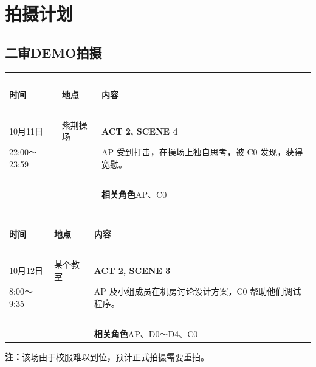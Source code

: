 \documentclass[10pt, a5paper, oneside]{memoir}
\begin{document}

\chapter*{拍摄计划}

\section*{二审DEMO拍摄}

\begin{table}[!ht]
	\raggedright
	\begin{tabular}{p{}p{}p{}}
		\toprule
		~ & & \\[-0.7em]
		\textbf{时间} & \textbf{地点} & \textbf{内容} \\[0.3em]
		\midrule
		~ & & \\[-0.7em]
		10月11日        & 紫荆操场 & \textbf{ACT 2, SCENE 4} \\[0.3em]
		22:00～23:59    & ~ & 
			AP 受到打击，在操场上独自思考，被 C0 发现，获得宽慰。
		\\
		~ & & \\[-0.7em]
		~ & ~ & \textbf{相关角色\quad}AP、C0 \\[0.3em]
		\bottomrule
	\end{tabular}
\end{table}

\begin{table}[!ht]
	\raggedright
	\begin{tabular}{p{}p{}p{}}
		\toprule
		~ & & \\[-0.7em]
		\textbf{时间} & \textbf{地点} & \textbf{内容} \\[0.3em]
		\midrule
		~ & & \\[-0.7em]
		10月12日        & 某个教室 & \textbf{ACT 2, SCENE 3} \\[0.3em]
		8:00～9:35      & ~ & 
			AP 及小组成员在机房讨论设计方案，C0 帮助他们调试程序。
		\\
		~ & & \\[-0.7em]
		~ & ~ & \textbf{相关角色\quad}AP、D0～D4、C0 \\[0.3em]
		\bottomrule
	\end{tabular}
\end{table}
{   \vspace{-0.7\baselineskip}
	\kai \small
	\textbf{注：}该场由于校服难以到位，预计正式拍摄需要重拍。
}
\end{document}
